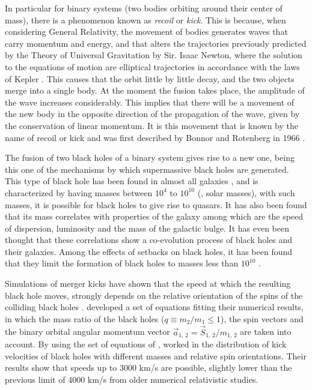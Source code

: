 	In particular for binary systems (two bodies orbiting around their center of mass), there is a phenomenon known as \textit{recoil} or \textit{kick}. This is because, when considering General Relativity, the movement of bodies generates waves that carry momentum and energy, and that alters the trajectories previously predicted by the Theory of Universal Gravitation by Sir. Isaac Newton, where the solution to the equations of motion are elliptical trajectories in accordance with the laws of Kepler \cite{hughes2005black, hoyng2006gravitational, brugmann2018fundamentals}. This causes that the orbit little by little decay, and the two objects merge into a single body. At the moment the fusion takes place, the amplitude of the wave increases considerably. This implies that there will be a movement of the new body in the opposite direction of the propagation of the wave, given by the conservation of linear momentum. It is this movement that is known by the name of recoil or kick and was first described by Bonnor and Rotenberg in 1966 \cite{hughes2005black, bonnor1966gravitational}.
	
	The fusion of two black holes of a binary system gives rise to a new one, being this one of the mechanisms by which supermassive black holes are generated. This type of black hole has been found in almost all galaxies \cite{choksi2017recoiling}, and is characterized by having masses between $10^4$ \sm to $10^{10}$ \sm (\sm, solar masses), with such masses, it is possible for black holes to give rise to quasars. It has also been found that its mass correlates with properties of the galaxy among which are the speed of dispersion, luminosity and the mass of the galactic bulge. It has even been thought that these correlations show a co-evolution process of black holes and their galaxies. Among the effects of setbacks on black holes, it has been found that they limit the formation of black holes to masses less than $10^{10}$ \sm \cite{choksi2017recoiling}.
	
	Simulations of merger kicks have shown that the speed at which the resulting black hole moves, strongly depends on the relative orientation of the spins of the colliding black holes \cite{baker2008modeling}. \citeauthor{baker2008modeling} developed a set of equations fitting their numerical results, in which the mass ratio of the black holes ($q \equiv m_2 / m_1 \leq 1$), the spin vectors and the binary orbital angular momentum vector $\vec{a}_\text{1, 2} = \vec{S}_\text{1, 2}/m_\text{1, 2}$ are taken into account. By using the set of equations of \citeauthor{baker2008modeling}, \citeauthor{tanaka2009assembly} worked in the distribution of kick velocities of black holes with different masses and relative spin orientations. Their results show that speeds up to 3000 km/s are possible, slightly lower than the previous limit of 4000 km/s from older numerical relativistic studies.
	
